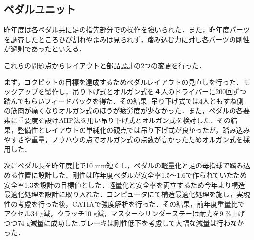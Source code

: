 \subsection{ペダルユニット}
昨年度は各ペダル共に足の指先部分での操作を強いられた．また，昨年度パーツを調査したところひび割れや歪みは見られず，踏み込む力に対し各パーツの剛性が過剰であったといえる．%

これらの問題点からレイアウトと部品設計の2つの変更を行った．

まず，コクピットの目標を達成するためペダルレイアウトの見直しを行った．モックアップを製作し，吊り下げ式とオルガン式を４人のドライバーに200回ずつ踏んでもらいフィードバックを得た．その結果, 吊り下げ式では4人ともすね側の筋肉が痛くなりオルガン式のほうが疲労度が少なかった．また，ペダルの各要素に重要度を設けAHP法を用い吊り下げ式とオルガン式を検討した．その結果，整備性とレイアウトの単純化の観点では吊り下げ式が良かったが，踏み込みやすさや重量，ノウハウの点でオルガン式の点数が高かったためオルガン式を採用した．

次にペダル長を昨年度比で10 mm短くし，ペダルの軽量化と足の母指球で踏み込める位置に設計した．剛性は昨年度ペダルが安全率1.5〜1.6で作られていたため安全率1.3を設計の目標値とした．軽量化と安全率を両立するため今年より構造最適化処理を設計に取り入れた．コンピュータにて構造最適化処理を施し，実現性の考慮を行った後，CATIAで強度解析を行った．その結果，前年度重量比でアクセル34 g減，クラッチ10 g減，マスターシリンダーステーは耐力を9 \%上げつつ74 g減量に成功した.ブレーキは剛性低下を考慮して大幅な減量は行わなかった．

